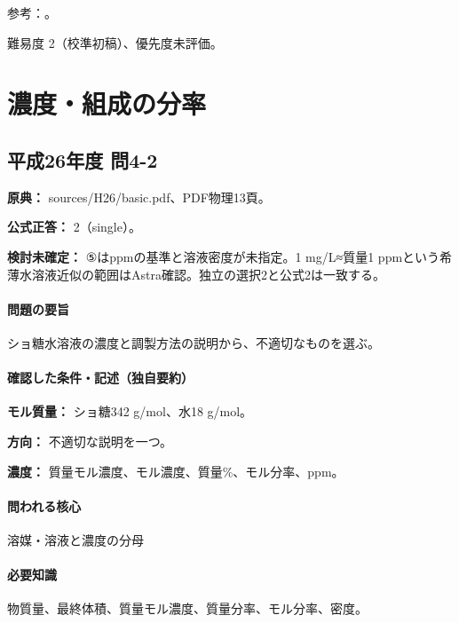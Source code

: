 \par 参考：\cite{murata_batio3,murata_thermistor,murata_piezo,tdk_varistor}。

\par 難易度 2（校準初稿）、優先度未評価。

\section{濃度・組成の分率}

\subsection{平成26年度 問4-2}
\label{q:h26-reg-basic-4-2}

\noindent\textbf{原典：} sources/H26/basic.pdf、PDF物理13頁。

\textbf{公式正答：} 2（single）。

\par\textbf{検討未確定：} ⑤はppmの基準と溶液密度が未指定。1 mg/L≈質量1 ppmという希薄水溶液近似の範囲はAstra確認。独立の選択2と公式2は一致する。

\paragraph{問題の要旨} ショ糖水溶液の濃度と調製方法の説明から、不適切なものを選ぶ。

\paragraph{確認した条件・記述（独自要約）}\mbox{}\par

\noindent\textbf{モル質量：} ショ糖342 g/mol、水18 g/mol。\par

\noindent\textbf{方向：} 不適切な説明を一つ。\par

\noindent\textbf{濃度：} 質量モル濃度、モル濃度、質量\%、モル分率、ppm。\par

\paragraph{問われる核心} 溶媒・溶液と濃度の分母

\paragraph{必要知識} 物質量、最終体積、質量モル濃度、質量分率、モル分率、密度。

